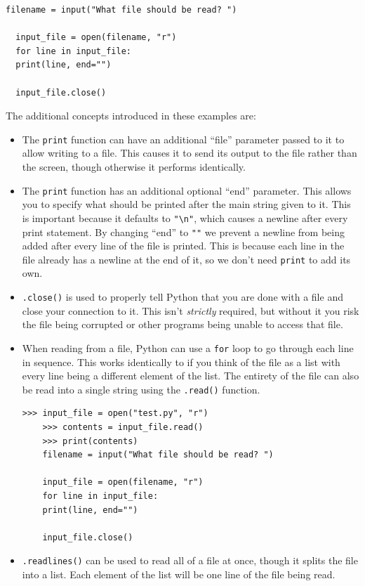 \documentclass[11pt]{cselabheader}
\begin{document}
\begin{lstlisting}[style=python]
  filename = input("What file should be read? ")

  input_file = open(filename, "r")
  for line in input_file:
  print(line, end="")

  input_file.close()
\end{lstlisting}

The additional concepts introduced in these examples are:

\begin{itemize}
\item The \lstinline{print} function can have an additional ``file'' parameter passed to it to allow writing to a file. This causes it to send its output to the file rather than the screen, though otherwise it performs identically.

\item The \lstinline{print} function has an additional optional ``end'' parameter. This allows you to specify what should be printed after the main string given to it. This is important because it defaults to \lstinline{"\n"}, which causes a newline after every print statement. By changing ``end'' to \lstinline{""} we prevent a newline from being added after every line of the file is printed. This is because each line in the file already has a newline at the end of it, so we don't need \lstinline{print} to add its own.

\item \lstinline{.close()} is used to properly tell Python that you are done with a file and close your connection to it. This isn't \emph{strictly} required, but without it you risk the file being corrupted or other programs being unable to access that file.

\item When reading from a file, Python can use a \lstinline{for} loop to go through each line in sequence. This works identically to if you think of the file as a list with every line being a different element of the list. The entirety of the file can also be read into a single string using the \lstinline{.read()} function.

  \begin{lstlisting}[style=ipython]
    >>> input_file = open("test.py", "r")
    >>> contents = input_file.read()
    >>> print(contents)
    filename = input("What file should be read? ")

    input_file = open(filename, "r")
    for line in input_file:
    print(line, end="")

    input_file.close()
  \end{lstlisting}

\item \lstinline{.readlines()} can be used to read all of a file at once, though it splits the file into a list. Each element of the list will be one line of the file being read.
\end{itemize}
\end{document}
